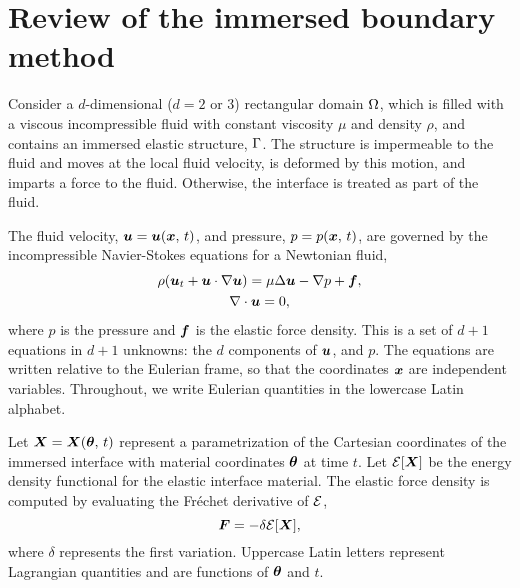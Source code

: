 \section{Review of the immersed boundary method} \label{sec:ib}

Consider a $d$-dimensional ($d=2$ or 3) rectangular domain $\Omega$, which is filled
with a viscous incompressible fluid with constant viscosity $\mu$ and density $\rho$, and
contains an immersed elastic structure, $\Gamma$. The structure is impermeable to the
fluid and moves at the local fluid velocity, is deformed by this motion, and imparts a
force to the fluid. Otherwise, the interface is treated as part of the fluid. 

The fluid velocity, $\boldsymbol{u} = \boldsymbol{u}(\boldsymbol{x},\,t)$, and pressure, $p = p(\boldsymbol{x},\,t)$, are governed by the
incompressible Navier-Stokes equations for a Newtonian fluid,
\begin{gather}
    \label{eq:ins-evol}
    \rho(\u_t + \u\cdot\grad\u) = \mu\Delta\u - \grad p + \f, \\
    \label{eq:ins-incomp}
    \div\u = 0,
\end{gather}
where $p$ is the pressure and $\boldsymbol{f}$ is the elastic force density. This is a set of $d+1$
equations in $d+1$ unknowns: the $d$ components of $\boldsymbol{u}$, and $p$. The equations are
written relative to the Eulerian frame, so that the coordinates $\boldsymbol{x}$ are independent
variables. Throughout, we write Eulerian quantities in the lowercase Latin alphabet.

Let $\boldsymbol{X}=\boldsymbol{X}(\boldsymbol{\theta},\,t)$ represent a parametrization of the Cartesian coordinates of the
immersed interface with material coordinates $\boldsymbol{\theta}$ at time $t$. Let $\mathcal{E}[\boldsymbol{X}]$ be the
energy density functional for the elastic interface material. The elastic force density
is computed by evaluating the Fréchet derivative of $\mathcal{E}$,
\begin{equation}
    \label{eq:forces}
    \boldsymbol{F} = -\delta \mathcal{E}[\boldsymbol{X}],
\end{equation}
where $\delta$ represents the first variation. Uppercase Latin letters represent
Lagrangian quantities and are functions of $\boldsymbol{\theta}$ and $t$.

